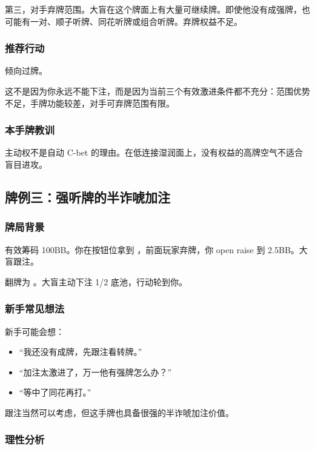 第三，对手弃牌范围。大盲在这个牌面上有大量可继续牌。即使他没有成强牌，也可能有一对、顺子听牌、同花听牌或组合听牌。弃牌权益不足。

\subsubsection*{推荐行动}

倾向过牌。

这不是因为你永远不能下注，而是因为当前三个有效激进条件都不充分：范围优势不足，手牌功能较差，对手可弃牌范围有限。

\subsubsection*{本手牌教训}

主动权不是自动 C-bet 的理由。在低连接湿润面上，没有权益的高牌空气不适合盲目进攻。

\subsection{牌例三：强听牌的半诈唬加注}

\subsubsection*{牌局背景}

有效筹码 100BB。你在按钮位拿到 ，前面玩家弃牌，你 open raise 到 2.5BB。大盲跟注。

翻牌为 。大盲主动下注 1/2 底池，行动轮到你。

\subsubsection*{新手常见想法}

新手可能会想：

\begin{itemize}
\item “我还没有成牌，先跟注看转牌。”
\item “加注太激进了，万一他有强牌怎么办？”
\item “等中了同花再打。”
\end{itemize}

跟注当然可以考虑，但这手牌也具备很强的半诈唬加注价值。

\subsubsection*{理性分析}

